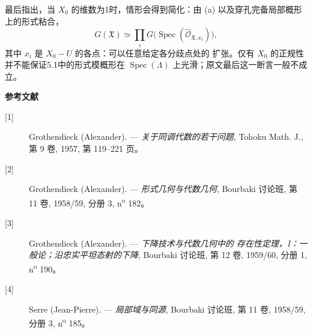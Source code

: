 最后指出，当 $X_0$ 的维数为1时，情形会得到简化：由 (a) 以及穿孔完备局部概形上的形式粘合，
\[
  G(\mathfrak X)\simeq
  \prod_iG\bigl(\operatorname{Spec}(\widehat{\mathcal O}_{\mathfrak X,x_i})\bigr),
\]
其中 $x_i$ 是 $X_0-U$ 的各点：可以任意给定各分歧点处的
扩张。仅有 $X_0$ 的正规性并不能保证5.1中的形式模概形在 $\operatorname{Spec}(\Lambda)$ 上光滑；原文最后这一断言一般不成立。

\begin{center}
  \textbf{参考文献}
\end{center}

\begin{description}
  \item[{[1]}] Grothendieck (Alexander). --- \emph{关于同调代数的若干问题},
    Tohoku Math. J., 第 9 卷, 1957, 第 119--221 页。
  \item[{[2]}] Grothendieck (Alexander). --- \emph{形式几何与代数几何},
    Bourbaki 讨论班, 第 11 卷, 1958/59, 分册 3,
    n\textsuperscript{o} 182。
  \item[{[3]}] Grothendieck (Alexander). --- \emph{下降技术与代数几何中的
    存在性定理，I：一般论；沿忠实平坦态射的下降}, Bourbaki 讨论班,
    第 12 卷, 1959/60, 分册 1, n\textsuperscript{o} 190。
  \item[{[4]}] Serre (Jean-Pierre). --- \emph{局部域与同源},
    Bourbaki 讨论班, 第 11 卷, 1958/59, 分册 3,
    n\textsuperscript{o} 185。
\end{description}

\par

